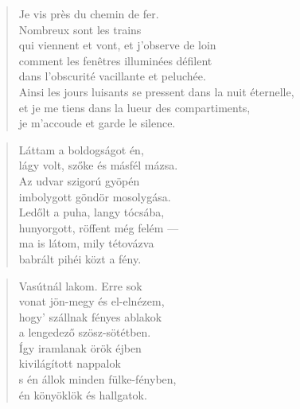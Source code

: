 \begin{verse}
  Je vis près du chemin de fer. \\
  Nombreux sont les trains \\
  qui viennent et vont, et j'observe de loin \\
  comment les fenêtres illuminées défilent \\
  dans l'obscurité vacillante et peluchée. \\
  Ainsi les jours luisants se pressent dans la nuit éternelle, \\
  et je me tiens dans la lueur des compartiments,\hspace*{-4mm} \\
  je m'accoude et garde le silence.
\end{verse}

\newpage


\vspace*{-15mm}
\centeredornament



\begin{verse}
  Láttam a boldogságot én, \\
  lágy volt, szőke és másfél mázsa. \\
  Az udvar szigorú gyöpén \\
  imbolygott göndör mosolygása. \\
  Ledőlt a puha, langy tócsába, \\
  hunyorgott, röffent még felém --- \\
  ma is látom, mily tétovázva \\
  babrált pihéi közt a fény.
\end{verse}

\bigskip


\begin{verse}
  Vasútnál lakom. Erre sok \\
  vonat jön-megy és el-elnézem, \\
  hogy' szállnak fényes ablakok \\
  a lengedező szösz-sötétben. \\
  Így iramlanak örök éjben \\
  kivilágított nappalok \\
  s én állok minden fülke-fényben, \\
  én könyöklök és hallgatok.
\end{verse}
